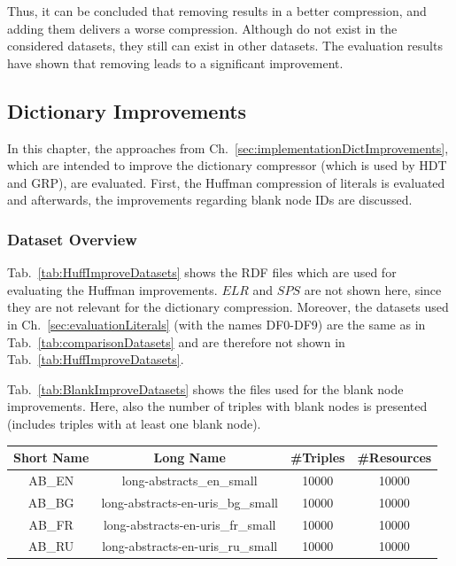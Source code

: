 Thus, it can be concluded that removing \dtps results in a better compression, and adding them delivers a worse compression. Although \dtps do not exist in the considered datasets, they still can exist in other datasets. The evaluation results have shown that removing \dtps leads to a significant improvement. 



\subsection{Dictionary Improvements}\label{sec:evaluationDictImprovements}

In this chapter, the approaches from Ch.~\ref{sec:implementationDictImprovements}, which are intended to improve the dictionary compressor \DHDT{} (which is used by HDT and GRP), are evaluated. First, the Huffman compression of literals is evaluated and afterwards, the improvements regarding blank node IDs are discussed. 

\subsubsection{Dataset Overview}

Tab.~\ref{tab:HuffImproveDatasets} shows the RDF files which are used for evaluating the Huffman improvements. $ELR$ and $SPS$ are not shown here, since they are not relevant for the dictionary compression. Moreover, the datasets used in Ch.~\ref{sec:evaluationLiterals} (with the names DF0-DF9) are the same as in Tab.~\ref{tab:comparisonDatasets} and are therefore not shown in Tab.~\ref{tab:HuffImproveDatasets}.

Tab.~\ref{tab:BlankImproveDatasets} shows the files used for the blank node improvements. Here, also the number of triples with blank nodes is presented (includes triples with at least one blank node).

\begin{center}
	\begin{tabular}{|c|c|c|c|}
		\hline 
		Short Name & Long Name & \#Triples & \#Resources \\ 
		\hline
		AB\_EN & long-abstracts\_en\_small & 10000 & 10000 \\
		\hline
		AB\_BG & long-abstracts-en-uris\_bg\_small & 10000 & 10000  \\
		\hline
		AB\_FR & long-abstracts-en-uris\_fr\_small & 10000 & 10000 \\
		\hline
		AB\_RU & long-abstracts-en-uris\_ru\_small & 10000 & 10000 \\
		\hline
	\end{tabular} 
	\label{tab:HuffImproveDatasets}
\end{center}

